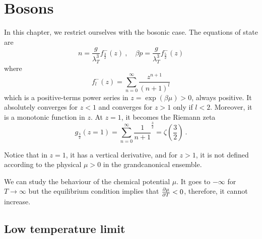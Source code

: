 \chapter{Bosons}

    In this chapter, we restrict ourselves with the bosonic case. The equations of state are 
    \begin{equation*}
        n = \frac{g}{\lambda^3_T} f^-_{\frac{3}{2}} (z) ~, \quad \beta p = \frac{g}{\lambda^3_T} f^-_{\frac{5}{2}} (z)
    \end{equation*}
    where 
    \begin{equation*}
        f_l^- (z) = \sum_{n=0}^\infty \frac{z^{n+1}}{(n+1)^l}
    \end{equation*}
    which is a positive-terms power series in $z = \exp(\beta\mu) > 0$, always positive. It absolutely converges for $z < 1$ and converges for $z > 1$ only if $l < 2$. Moreover, it is a monotonic function in $z$. At $z = 1$, it becomes the Riemann zeta 
    \begin{equation*}
        g_{\frac{3}{2}} (z=1) = \sum_{n=0}^\infty \frac{1}{n+1}^{\frac{3}{2}} = \zeta(\frac{3}{2}) ~.
    \end{equation*}

    Notice that in $z = 1$, it has a vertical derivative, and for $z > 1$, it is not defined according to the physical $\mu > 0$ in the grandcanonical ensemble. 

    We can study the behaviour of the chemical potential $\mu$. It goes to $-\infty$ for $T \rightarrow \infty$ but the equilibrium condition implies that $\frac{\partial\mu}{\partial T} < 0$, therefore, it cannot increase. 

\section{Low temperature limit}